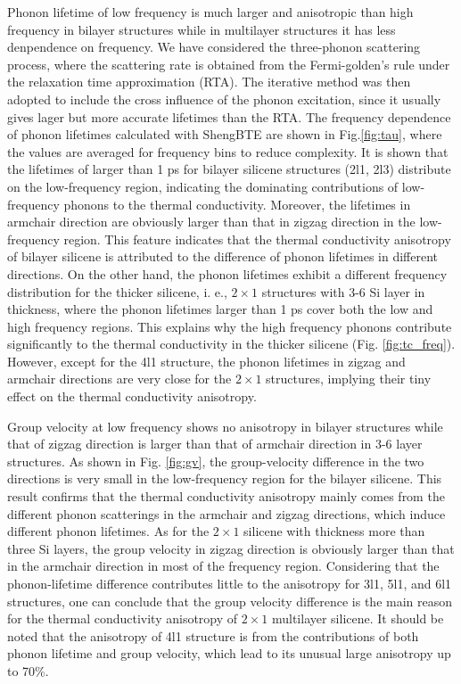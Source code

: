 \documentclass[aps,prb,twocolumn,showpacs,amsmath,amssymb]{revtex4-1}
\begin{document}
Phonon lifetime of low frequency is much larger and anisotropic than high frequency in bilayer structures while in multilayer structures it has less denpendence on frequency. We have considered the three-phonon scattering process, where the scattering rate is obtained from the Fermi-golden's rule\cite{Li2014} under the relaxation time approximation (RTA). The iterative method was then adopted to include the cross influence of the phonon excitation, since it usually gives lager but more accurate lifetimes than the RTA. The frequency dependence of phonon lifetimes calculated with ShengBTE\cite{Li2014} are shown in Fig.\ref{fig:tau}, where the values are averaged for frequency bins to reduce complexity.  It is shown that the lifetimes of larger than 1 ps for bilayer silicene structures (2l1, 2l3) distribute on the low-frequency region, indicating the dominating contributions of low-frequency phonons to the thermal conductivity. Moreover, the lifetimes in armchair direction are obviously larger than that in zigzag direction in the low-frequency region. This feature indicates that the thermal conductivity anisotropy of bilayer silicene is attributed to the difference of phonon lifetimes in different directions.
On the other hand, the phonon lifetimes exhibit a different frequency distribution for the thicker silicene, i. e.,  $2\times1$ structures with 3-6 Si layer in thickness, where the phonon lifetimes larger than 1 ps cover both the low and high frequency regions.  This explains why the high frequency phonons contribute significantly to the thermal conductivity in the thicker silicene (Fig. \ref{fig:tc_freq}).  However, except for the 4l1 structure, the phonon lifetimes in zigzag and armchair directions are very close for the $2\times1$ structures, implying their tiny effect on the thermal conductivity anisotropy.



Group velocity at low frequency shows no anisotropy in bilayer structures while that of zigzag direction is larger than that of armchair direction in 3-6 layer structures. As shown in Fig. \ref{fig:gv},  the group-velocity difference in the two directions is very small in the low-frequency region for the bilayer silicene. This result confirms that the thermal conductivity anisotropy mainly comes from the different phonon scatterings in the armchair and zigzag directions,  which induce different phonon lifetimes.
As for the $2\times 1$ silicene with thickness more than three Si layers,  the group velocity in zigzag direction is obviously larger than that in the armchair direction in most of the frequency region. Considering that the phonon-lifetime difference contributes little to the anisotropy for 3l1, 5l1, and 6l1 structures, one can conclude that the group velocity difference is the main reason for the thermal conductivity anisotropy of $2\times 1$ multilayer silicene. It should be noted that the anisotropy of 4l1 structure is from the contributions of both phonon lifetime and group velocity, which lead to its unusual large anisotropy up to 70\%.
\end{document}
